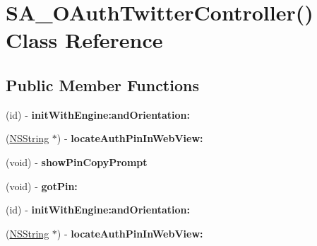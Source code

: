 \hypertarget{interface_s_a___o_auth_twitter_controller_07_08}{
\section{\-S\-A\-\_\-\-O\-Auth\-Twitter\-Controller() \-Class \-Reference}
\label{interface_s_a___o_auth_twitter_controller_07_08}
}
\subsection*{\-Public \-Member \-Functions}
\begin{DoxyCompactItemize}
\item 
\hypertarget{interface_s_a___o_auth_twitter_controller_07_08_a5aa3491f5095ff2234d33d1296d85a83}{
(id) -\/ {\bfseries init\-With\-Engine\-:and\-Orientation\-:}}
\label{interface_s_a___o_auth_twitter_controller_07_08_a5aa3491f5095ff2234d33d1296d85a83}

\item 
\hypertarget{interface_s_a___o_auth_twitter_controller_07_08_a9ac5a12c8229d236069f941bf29b1f2a}{
(\hyperlink{class_n_s_string}{\-N\-S\-String} $\ast$) -\/ {\bfseries locate\-Auth\-Pin\-In\-Web\-View\-:}}
\label{interface_s_a___o_auth_twitter_controller_07_08_a9ac5a12c8229d236069f941bf29b1f2a}

\item 
\hypertarget{interface_s_a___o_auth_twitter_controller_07_08_af001aade3415c31af271d7a5cfc5038c}{
(void) -\/ {\bfseries show\-Pin\-Copy\-Prompt}}
\label{interface_s_a___o_auth_twitter_controller_07_08_af001aade3415c31af271d7a5cfc5038c}

\item 
\hypertarget{interface_s_a___o_auth_twitter_controller_07_08_a8298f7f066e532ac617d88e6ac02fc9d}{
(void) -\/ {\bfseries got\-Pin\-:}}
\label{interface_s_a___o_auth_twitter_controller_07_08_a8298f7f066e532ac617d88e6ac02fc9d}

\item 
\hypertarget{interface_s_a___o_auth_twitter_controller_07_08_a5aa3491f5095ff2234d33d1296d85a83}{
(id) -\/ {\bfseries init\-With\-Engine\-:and\-Orientation\-:}}
\label{interface_s_a___o_auth_twitter_controller_07_08_a5aa3491f5095ff2234d33d1296d85a83}

\item 
\hypertarget{interface_s_a___o_auth_twitter_controller_07_08_a9ac5a12c8229d236069f941bf29b1f2a}{
(\hyperlink{class_n_s_string}{\-N\-S\-String} $\ast$) -\/ {\bfseries locate\-Auth\-Pin\-In\-Web\-View\-:}}
\label{interface_s_a___o_auth_twitter_controller_07_08_a9ac5a12c8229d236069f941bf29b1f2a}


\end{DoxyCompactItemize}
